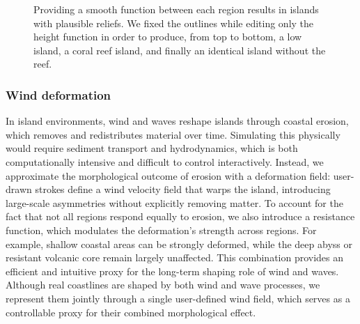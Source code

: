 \begin{figure}
    \caption{Providing a smooth function between each region results in islands with plausible reliefs. We fixed the outlines while editing only the height function in order to produce, from top to bottom, a low island, a coral reef island, and finally an identical island without the reef.}
    \label{fig:coral-island-procedural-smooth-heights}
\end{figure}

\subsubsection{Wind deformation}
\label{sec:coral-island-wind-deformation}


In island environments, wind and waves reshape islands through coastal erosion, which removes and redistributes material over time. Simulating this physically would require sediment transport and hydrodynamics, which is both computationally intensive and difficult to control interactively. Instead, we approximate the morphological outcome of erosion with a deformation field: user-drawn strokes define a wind velocity field that warps the island, introducing large-scale asymmetries without explicitly removing matter. To account for the fact that not all regions respond equally to erosion, we also introduce a resistance function, which modulates the deformation's strength across regions. For example, shallow coastal areas can be strongly deformed, while the deep abyss or resistant volcanic core remain largely unaffected. This combination provides an efficient and intuitive proxy for the long-term shaping role of wind and waves.
Although real coastlines are shaped by both wind and wave processes, we represent them jointly through a single user-defined wind field, which serves as a controllable proxy for their combined morphological effect.

